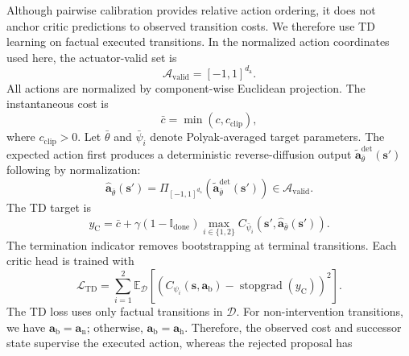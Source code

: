 \documentclass[9pt,journal]{IEEEtran}
\newcommand{\D}{\mathcal{D}}
\newcommand{\Avalid}{\mathcal{A}_{\mathrm{valid}}}
\newcommand{\E}{\mathbb{E}}
\newcommand{\ind}{\mathbb{I}}
\newcommand{\va}{\bm{a}}
\newcommand{\vs}{\bm{s}}
\newcommand{\vah}{\ensuremath{\va_{\mathrm h}}}      %
\newcommand{\van}{\ensuremath{\va_{\mathrm n}}}      %
\newcommand{\vab}{\ensuremath{\va_{\mathrm b}}}      %
\begin{document}
Although pairwise calibration provides relative action ordering, it does not anchor critic predictions to observed
transition costs. We therefore use TD learning on
factual executed transitions. In the
normalized action coordinates used here, the actuator-valid set is
\begin{equation*}
    \Avalid=[-1,1]^{d_{\mathrm a}}.
\end{equation*}
All actions are normalized by component-wise Euclidean projection. The instantaneous cost is
\begin{equation*}
    \bar c
    =
    \min\!\left(c,c_{\mathrm{clip}}\right),
\end{equation*}
where $c_{\mathrm{clip}}>0$. Let $\bar\theta$ and $\bar\psi_i$ denote
Polyak-averaged target parameters. The expected action first produces a
deterministic reverse-diffusion output
$\tilde{\va}^{\mathrm{det}}_{\bar\theta}(\vs')$ following by normalization:
\begin{equation*}
    \widehat{\va}_{\bar\theta}(\vs')
    =
    \Pi_{[-1,1]^{d_{\mathrm a}}}
    \left(
    \tilde{\va}^{\mathrm{det}}_{\bar\theta}(\vs')
    \right)
    \in\Avalid.
\end{equation*}
The TD target is
\begin{equation}
    y_{\mathrm C}
    =
    \bar c
    +
    \gamma
    \left(1-\ind_{\mathrm{done}}\right)
    \max_{i\in\{1,2\}}
    C_{\bar\psi_i}
    \left(
    \vs',
    \widehat{\va}_{\bar\theta}\!\left(\vs'\right)
    \right).
    \label{eq:tdtarget}
\end{equation}
The termination indicator removes bootstrapping at terminal
transitions. Each critic head is trained with
\begin{equation}
    \mathcal{L}_{\mathrm{TD}}
    =
    \sum_{i=1}^{2}
    \E_{\D}
    \left[
    \left(
    C_{\psi_i}\!\left(\vs,\vab\right)
    -
    \operatorname{stopgrad}\!\left(y_{\mathrm C}\right)
    \right)^2
    \right].
    \label{eq:tdloss}
\end{equation}
The TD loss uses only factual transitions in $\D$.
For non-intervention transitions, we have $\vab=\van$;
otherwise, $\vab=\vah$.
Therefore, the observed cost and successor state supervise
the executed action, whereas the rejected proposal has
\end{document}
